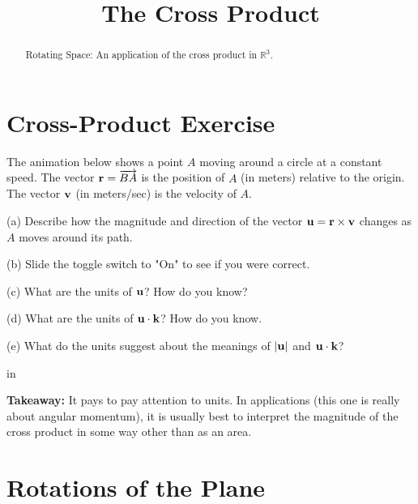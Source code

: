 \documentclass{ximera}
\title{The Cross Product}
\newcommand{\pskip}{\vskip 0.1 in}
\begin{document}
\begin{abstract}
Rotating Space: An application of the cross product in $\mathbb{R}^3$.
\end{abstract}
\maketitle


\section{Cross-Product Exercise}
The animation below shows a point $A$ moving around a circle at a constant speed. The vector ${\bf r} = \overrightarrow{BA}$ is the position of $A$ (in meters) relative to the origin. The vector ${\bf v}$ (in meters/sec) is the velocity of $A$. 

(a) Describe how the magnitude and direction of the vector ${\bf u} = {\bf r}\times {\bf v}$ changes as $A$ moves around its path.

(b) Slide the toggle switch to "On" to see if you were correct.

(c) What are the units of ${\bf u}$? How do you know?

(d) What are the units of ${\bf u} \cdot {\bf k}$? How do you know.

(e) What do the units suggest about the meanings of $|{\bf u}|$ and ${\bf u} \cdot {\bf k}$?

\pskip

{\bf Takeaway:} It pays to pay attention to units. In applications (this one is really about angular momentum), it is usually best to interpret the magnitude of the cross product in some way other than as an area.


\begin{exploration}   \label{Exsd67g:Cross}
 
\begin{onlineOnly}
    \begin{center}
\end{center}
\end{onlineOnly}

\end{exploration}

\section{Rotations of the Plane}
\end{document}
